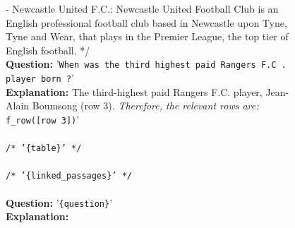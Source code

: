 \begin{figure}[htb]
\begin{tcolorbox}
{- Newcastle United F.C.: Newcastle United Football Club is an English professional football club based in Newcastle upon Tyne, Tyne and Wear, that plays in the Premier League, the top tier of English football.
*/}
 \\
\textbf{Question:} '\texttt{When was the third highest paid Rangers F.C . player born ?}' \\
\textbf{Explanation:} The third-highest paid Rangers F.C. player, Jean-Alain Boumsong (row 3). \textit{Therefore, the relevant rows are:} \texttt{f\_row([row 3])}'
 \\
 \\
\texttt{/* '{\texttt{\{table\}}}' */} \\
 \\
\texttt{/* '{\texttt{\{linked\_passages\}}}' */} \\
 \\
\textbf{Question:} '{\texttt{\{question\}}}' \\
\textbf{Explanation:}

\end{tcolorbox}
\label{fig:column_aggregation}
\end{figure}













\newpage
\newpage


